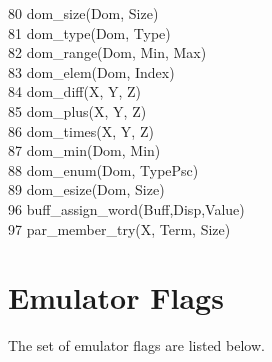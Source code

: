 \documentclass[11pt]{article}
\begin{document}
\begin{tabbing}
80 \> dom\_size(Dom, Size)		\>			\\
81 \> dom\_type(Dom, Type)		\>			\\
82 \> dom\_range(Dom, Min, Max)		\>			\\
83 \> dom\_elem(Dom, Index)		\>			\\
84 \> dom\_diff(X, Y, Z)		\>			\\
85 \> dom\_plus(X, Y, Z)		\>			\\
86 \> dom\_times(X, Y, Z)		\>			\\
87 \> dom\_min(Dom, Min)		\>			\\
88 \> dom\_enum(Dom, TypePsc)		\>			\\
89 \> dom\_esize(Dom, Size)		\>			\\
96 \> buff\_assign\_word(Buff,Disp,Value) \>			\\
97 \> par\_member\_try(X, Term, Size)	\>			\\
\end{tabbing}

\section		{Emulator Flags}
%
\label{s:emuflags}

The set of emulator flags are listed below.
\end{document}
